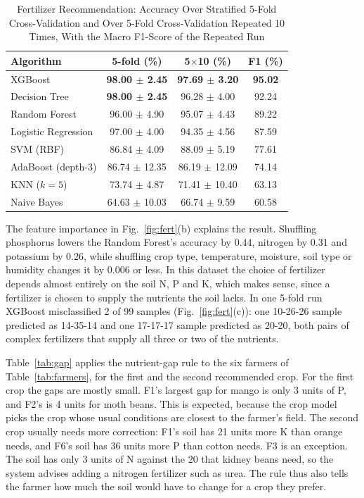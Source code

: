 \documentclass[conference]{IEEEtran}
\begin{document}
\begin{table}[htbp]
\caption{Fertilizer Recommendation: Accuracy Over Stratified 5-Fold Cross-Validation and Over 5-Fold Cross-Validation Repeated 10 Times, With the Macro F1-Score of the Repeated Run}
\label{tab:fert}
\centering
\footnotesize
\setlength{\tabcolsep}{3pt}
\begin{tabular}{@{}lccc@{}}
\toprule
\textbf{Algorithm} & \textbf{5-fold (\%)} & \textbf{5$\times$10 (\%)} & \textbf{F1 (\%)} \\
\midrule
XGBoost & \textbf{98.00 $\pm$ 2.45} & \textbf{97.69 $\pm$ 3.20} & \textbf{95.02} \\
Decision Tree & \textbf{98.00 $\pm$ 2.45} & 96.28 $\pm$ 4.00 & 92.24 \\
Random Forest & 96.00 $\pm$ 4.90 & 95.07 $\pm$ 4.43 & 89.22 \\
Logistic Regression & 97.00 $\pm$ 4.00 & 94.35 $\pm$ 4.56 & 87.59 \\
SVM (RBF) & 86.84 $\pm$ 4.09 & 88.09 $\pm$ 5.19 & 77.61 \\
AdaBoost (depth-3) & 86.74 $\pm$ 12.35 & 86.19 $\pm$ 12.09 & 74.14 \\
KNN ($k=5$) & 73.74 $\pm$ 4.87 & 71.41 $\pm$ 10.40 & 63.13 \\
Naive Bayes & 64.63 $\pm$ 10.03 & 66.74 $\pm$ 9.59 & 60.58 \\
\bottomrule
\end{tabular}
\end{table}

The feature importance in Fig.~\ref{fig:fert}(b) explains the result. Shuffling phosphorus lowers the Random Forest's accuracy by 0.44, nitrogen by 0.31 and potassium by 0.26, while shuffling crop type, temperature, moisture, soil type or humidity changes it by 0.006 or less. In this dataset the choice of fertilizer depends almost entirely on the soil N, P and K, which makes sense, since a fertilizer is chosen to supply the nutrients the soil lacks. In one 5-fold run XGBoost misclassified 2 of 99 samples (Fig.~\ref{fig:fert}(c)): one 10-26-26 sample predicted as 14-35-14 and one 17-17-17 sample predicted as 20-20, both pairs of complex fertilizers that supply all three or two of the nutrients.

Table~\ref{tab:gap} applies the nutrient-gap rule to the six farmers of Table~\ref{tab:farmers}, for the first and the second recommended crop. For the first crop the gaps are mostly small. F1's largest gap for mango is only 3 units of P, and F2's is 4 units for moth beans. This is expected, because the crop model picks the crop whose usual conditions are closest to the farmer's field. The second crop usually needs more correction: F1's soil has 21 units more K than orange needs, and F6's soil has 36 units more P than cotton needs. F3 is an exception. The soil has only 3 units of N against the 20 that kidney beans need, so the system advises adding a nitrogen fertilizer such as urea. The rule thus also tells the farmer how much the soil would have to change for a crop they prefer.
\end{document}
